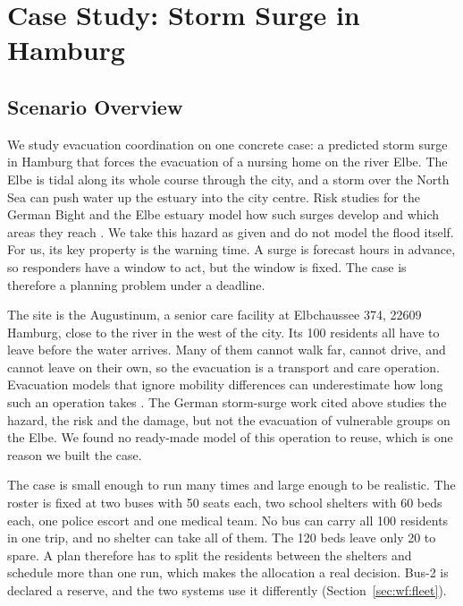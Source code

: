 \chapter{Case Study: Storm Surge in Hamburg}
\label{ch:casestudy}

\section{Scenario Overview}
\label{sec:cs:overview}

We study evacuation coordination on one concrete case: a predicted storm surge
in Hamburg that forces the evacuation of a nursing home on the river Elbe. The
Elbe is tidal along its whole course through the city, and a storm over the
North Sea can push water up the estuary into the city centre. Risk studies for
the German Bight and the Elbe estuary model how such surges develop and which
areas they reach \parencite{oumeraci2015a}. We take this hazard as
given and do not model the flood itself. For us, its key property is the
warning time. A surge is forecast hours in advance, so responders have a
window to act, but the window is fixed. The case is therefore a planning problem
under a deadline.

The site is the Augustinum, a senior care facility at Elbchaussee 374, 22609
Hamburg, close to the river in the west of the city. Its 100 residents all have
to leave before the water arrives. Many of them cannot walk far, cannot drive,
and cannot leave on their own, so the evacuation is a transport and care
operation. Evacuation models that ignore mobility differences can underestimate
how long such an operation takes \parencite{alqahtani2025a}. The German
storm-surge work cited above studies the hazard, the risk and the damage, but
not the evacuation of vulnerable groups on the Elbe. We found no ready-made
model of this operation to reuse, which is one reason we built the case.

The case is small enough to run many times and large enough to be realistic.
The roster is fixed at two buses with 50 seats each, two school shelters with
60 beds each, one police escort and one medical team. No bus can carry all 100
residents in one trip, and no shelter can take all of them. The 120 beds leave
only 20 to spare. A plan therefore has to split the residents between the
shelters and schedule more than one run, which makes the allocation a real
decision. Bus-2 is declared a reserve, and the two systems use it differently
(Section~\ref{sec:wf:fleet}).

